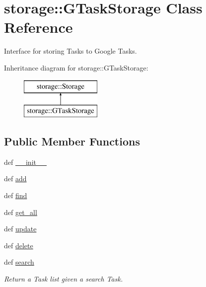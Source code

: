 \hypertarget{classstorage_1_1GTaskStorage}{
\section{storage\-:\-:\-G\-Task\-Storage \-Class \-Reference}
\label{classstorage_1_1GTaskStorage}
}


\-Interface for storing \-Tasks to \-Google \-Tasks.  


\-Inheritance diagram for storage\-:\-:\-G\-Task\-Storage\-:\begin{figure}[H]
\begin{center}
\leavevmode
\includegraphics[height=2.000000cm]{classstorage_1_1GTaskStorage}
\end{center}
\end{figure}
\subsection*{\-Public \-Member \-Functions}
\begin{DoxyCompactItemize}
\item 
def \hyperlink{classstorage_1_1GTaskStorage_af3ffb72b776e8710e4e8b21e0332e5aa}{\-\_\-\-\_\-init\-\_\-\-\_\-}
\item 
def \hyperlink{classstorage_1_1GTaskStorage_a72ab709717d8de24f98ac7bad49e2df7}{add}
\item 
def \hyperlink{classstorage_1_1GTaskStorage_a618c0ae51a54f156dee09ecafef8d1a0}{find}
\item 
def \hyperlink{classstorage_1_1GTaskStorage_a7babf14f4d14119f9c8230d91b37ef79}{get\-\_\-all}
\item 
def \hyperlink{classstorage_1_1GTaskStorage_acc41c8c0e63a97bd2093efc542d92b1a}{update}
\item 
def \hyperlink{classstorage_1_1GTaskStorage_a6a5ecc4bf9ea5604baaf29b98d6cf311}{delete}
\item 
def \hyperlink{classstorage_1_1GTaskStorage_a1d112c05463018ea6dfa3eea65196fd6}{search}
\begin{DoxyCompactList}\small\item\em \-Return a \-Task list given a search \-Task. \end{DoxyCompactList}\end{DoxyCompactItemize}


